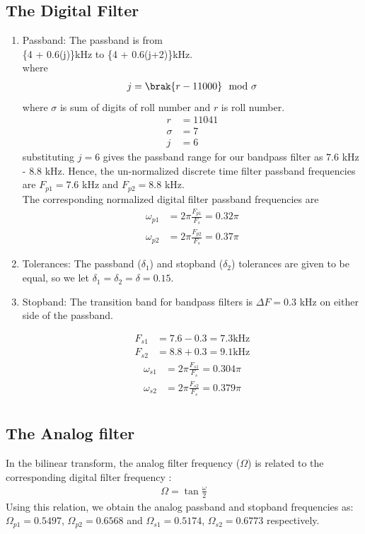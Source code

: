 \documentclass[journal,12pt,twocolumn]{IEEEtran}
\theoremstyle{remark}
\begin{document}
\subsection{The Digital Filter}
\begin{enumerate}
\item {Passband:}
The passband is from \\
\{4 + 0.6(j)\}kHz to \{4 + 0.6(j+2)\}kHz. \\
where 
\begin{align}
    j=\brak{r-11000} \mod \sigma
\end{align}
where $\sigma$ is sum of digits of roll number and $r$ is roll number.\\
\begin{align}
    r&=11041\\
    \sigma  &=7\\
    j&=6
\end{align}
 substituting $j =6$ gives the passband
range for our bandpass filter as $7.6$ kHz - $8.8$ kHz.  Hence, the un-normalized discrete time filter
passband frequencies are $F_{p1} = 7.6$ kHz
and $F_{p2} = 8.8$ kHz. \\
The corresponding normalized digital filter passband frequencies are
\begin{align}
    \omega_{p1} &= 2\pi\frac{F_{p1}}{F_s} = 0.32 \pi\\
    \omega_{p2} &= 2\pi\frac{F_{p2}}{F_s}  =0.37 \pi
\end{align}

\item {Tolerances:}  The passband ($\delta_1$) and stopband ($\delta_2$) tolerances are given to
be equal, so we let $\delta_1 = \delta_2 = \delta = 0.15$.
\\
\item { Stopband:}  The {transition band} for bandpass filters is $\Delta F = 0.3$ kHz on either side of the passband.

\begin{align}
    F_{s1} &= 7.6-0.3 = 7.3 \text{kHz}\\
    F	_{s2} &= 8.8+0.3 = 9.1  \text{kHz}
\end{align}
\begin{align}
    \omega_{s1} &= 2\pi\frac{F_{s1}}{F_s} = 0.304 \pi\\
     \omega_{s2} &= 2\pi\frac{F_{s2}}{F_s} = 0.379 \pi\\
\end{align}
\end{enumerate}
\subsection{The Analog filter}
In the bilinear transform, the analog filter frequency ($\Omega$) is related to the corresponding digital filter frequency\brak{\omega} :
\begin{align}
  \Omega = \tan \frac{\omega}{2}  
\end{align}
Using this relation, we obtain the analog passband and stopband frequencies as:
$\Omega_{p1} = 0.5497$, $\Omega_{p2} = 0.6568$ and $\Omega_{s1} = 0.5174$, $\Omega_{s2} = 0.6773$
respectively.
\end{document}
